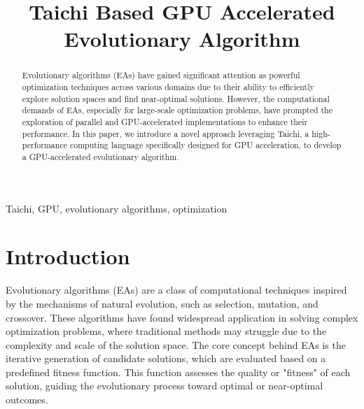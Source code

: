 \documentclass[conference]{IEEEtran}
\begin{document}
\title{Taichi Based GPU Accelerated Evolutionary Algorithm}

\author{
    \and
    \and
}

\maketitle

\begin{abstract}
    Evolutionary algorithms (EAs) have gained significant attention as powerful optimization techniques across various domains due to their ability to efficiently explore solution spaces and find near-optimal solutions. However, the computational demands of EAs, especially for large-scale optimization problems, have prompted the exploration of parallel and GPU-accelerated implementations to enhance their performance. In this paper, we introduce a novel approach leveraging Taichi, a high-performance computing language specifically designed for GPU acceleration, to develop a GPU-accelerated evolutionary algorithm.
\end{abstract}

\begin{IEEEkeywords}
    Taichi, GPU, evolutionary algorithms, optimization
\end{IEEEkeywords}

\section{Introduction}
Evolutionary algorithms (EAs) are a class of computational techniques inspired
by the mechanisms of natural evolution, such as selection, mutation, and
crossover. These algorithms have found widespread application in solving
complex optimization problems, where traditional methods may struggle due to
the complexity and scale of the solution space. The core concept behind EAs is
the iterative generation of candidate solutions, which are evaluated based on a
predefined fitness function. This function assesses the quality or "fitness" of
each solution, guiding the evolutionary process toward optimal or near-optimal
outcomes.
\end{document}
